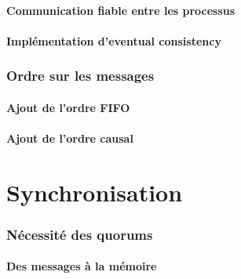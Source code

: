 \subsection{Communication fiable entre les processus}




 
\subsection{Implémentation d'eventual consistency}





 
\section{Ordre sur les messages}
 
\subsection{Ajout de l'ordre FIFO}



 
\subsection{Ajout de l'ordre causal}




 
 
\part{Synchronisation}
 
 
\section{Nécessité des quorums}
 
\subsection{Des messages à la mémoire}


 

